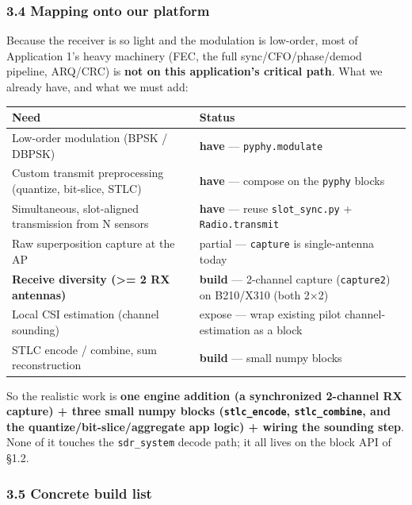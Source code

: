 \documentclass[
  10pt,
]{article}
\begin{document}
\hypertarget{34-mapping-onto-our-platform}{%
\subsubsection{3.4 Mapping onto our
platform}\label{34-mapping-onto-our-platform}}

Because the receiver is so light and the modulation is low-order, most
of Application 1's heavy machinery (FEC, the full sync/CFO/phase/demod
pipeline, ARQ/CRC) is \textbf{not on this application's critical path}.
What we already have, and what we must add:

\begin{longtable}[]{@{}ll@{}}
\toprule
Need & Status \\
\midrule
\endhead
Low-order modulation (BPSK / DBPSK) & \textbf{have} ---
\texttt{pyphy.modulate} \\
Custom transmit preprocessing (quantize, bit-slice, STLC) &
\textbf{have} --- compose on the \texttt{pyphy} blocks \\
Simultaneous, slot-aligned transmission from N sensors & \textbf{have}
--- reuse \texttt{slot\_sync.py} + \texttt{Radio.transmit} \\
Raw superposition capture at the AP & partial --- \texttt{capture} is
single-antenna today \\
\textbf{Receive diversity (\textgreater= 2 RX antennas)} &
\textbf{build} --- 2-channel capture (\texttt{capture2}) on B210/X310
(both 2×2) \\
Local CSI estimation (channel sounding) & expose --- wrap existing pilot
channel-estimation as a block \\
STLC encode / combine, sum reconstruction & \textbf{build} --- small
numpy blocks \\
\bottomrule
\end{longtable}

So the realistic work is \textbf{one engine addition (a synchronized
2-channel RX capture) + three small numpy blocks (\texttt{stlc\_encode},
\texttt{stlc\_combine}, and the quantize/bit-slice/aggregate app logic)
+ wiring the sounding step}. None of it touches the \texttt{sdr\_system}
decode path; it all lives on the block API of §1.2.

\hypertarget{35-concrete-build-list}{%
\subsubsection{3.5 Concrete build list}\label{35-concrete-build-list}}
\end{document}
